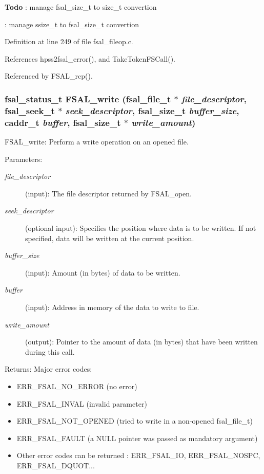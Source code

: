 \begin{Desc}
\item[{\bf Todo}]: manage fsal\_\-size\_\-t to size\_\-t convertion 

: manage ssize\_\-t to fsal\_\-size\_\-t convertion\end{Desc}


Definition at line 249 of file fsal\_\-fileop.c.

References hpss2fsal\_\-error(), and Take\-Token\-FSCall().

Referenced by FSAL\_\-rcp().
\subsubsection{\setlength{\rightskip}{0pt plus 5cm}fsal\_\-status\_\-t FSAL\_\-write (fsal\_\-file\_\-t $\ast$ {\em file\_\-descriptor}, fsal\_\-seek\_\-t $\ast$ {\em seek\_\-descriptor}, fsal\_\-size\_\-t {\em buffer\_\-size}, caddr\_\-t {\em buffer}, fsal\_\-size\_\-t $\ast$ {\em write\_\-amount})}\label{fsal__fileop_8c_a3}


FSAL\_\-write: Perform a write operation on an opened file.

\begin{Desc}
\item[Parameters:]
\begin{description}
\item[{\em file\_\-descriptor}](input): The file descriptor returned by FSAL\_\-open. \item[{\em seek\_\-descriptor}](optional input): Specifies the position where data is to be written. If not specified, data will be written at the current position. \item[{\em buffer\_\-size}](input): Amount (in bytes) of data to be written. \item[{\em buffer}](input): Address in memory of the data to write to file. \item[{\em write\_\-amount}](output): Pointer to the amount of data (in bytes) that have been written during this call.\end{description}
\end{Desc}
\begin{Desc}
\item[Returns:]Major error codes:\begin{itemize}
\item ERR\_\-FSAL\_\-NO\_\-ERROR (no error)\item ERR\_\-FSAL\_\-INVAL (invalid parameter)\item ERR\_\-FSAL\_\-NOT\_\-OPENED (tried to write in a non-opened fsal\_\-file\_\-t)\item ERR\_\-FSAL\_\-FAULT (a NULL pointer was passed as mandatory argument)\item Other error codes can be returned : ERR\_\-FSAL\_\-IO, ERR\_\-FSAL\_\-NOSPC, ERR\_\-FSAL\_\-DQUOT...\end{itemize}
\end{Desc}


